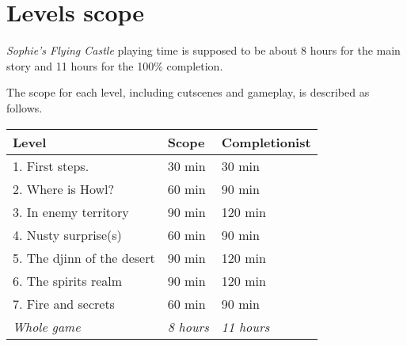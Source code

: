 \section{Levels scope}

\textit{Sophie's Flying Castle} playing time is supposed to be about 8 hours for the main story and 11 hours for the 100\% completion.

The scope for each level, including cutscenes and gameplay, is described as follows.

\begin{table}[H]
\centering
\begin{tabular}{|l|l|l|}
\hline
\rowcolor[HTML]{9B9B9B} 
Level & Scope & Completionist \\ \hline
1. First steps. & 30 min & 30 min \\ \hline
2. Where is Howl? & 60 min & 90 min \\ \hline
3. In enemy territory & 90 min & 120 min \\ \hline
4. Nusty surprise(s) & 60 min & 90 min \\ \hline
5. The djinn of the desert & 90 min & 120 min \\ \hline
6. The spirits realm & 90 min & 120 min \\ \hline
7. Fire and secrets & 60 min & 90 min \\ \hline
\textit{Whole game} & \textit{8 hours} & \textit{11 hours} \\ \hline
\end{tabular}
\end{table}
